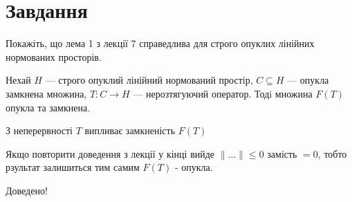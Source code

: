 
\chapter{Завдання \theHchapter}

\begin{tcolorbox}[title=Завдання]
    Покажіть, що лема 1 з лекції 7 справедлива для строго 
    опуклих лінійних нормованих просторів.
\end{tcolorbox}

\begin{tcolorbox}[title=Лема]
    Нехай $H$ — строго опуклий лінійний нормований простір, 
    $C \subseteq H$ — опукла замкнена
    множина, $T : C \rightarrow H$ — нерозтягуючий оператор. 
    Тодi множина $F(T)$ опукла та замкнена.
\end{tcolorbox}



З неперервності $T$ випливає замкненість $F(T)$


Якщо повторити доведення з лекції у кінці вийде $\|\dots \| \le 0$ замість $=0$, 
тобто рзультат залишиться тим самим $F(T)$ - опукла.


Доведено!